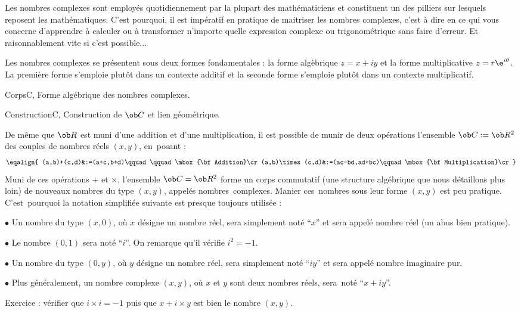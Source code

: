 Les nombres complexes sont employés quotidiennement par la plupart des ma\-thé\-ma\-ti\-ciens et constituent un des pilliers sur lesquels reposent les mathématiques. 
C'est pourquoi, il est impératif en pratique de maitriser les nombres complexes, c'est à dire en ce qui vous concerne d'apprendre à calculer ou à transformer n'importe quelle expression complexe ou trigonométrique sans faire d'erreur. Et raisonnablement vite si c'est possible...

Les nombres complexes se présentent sous deux formes fondamentales : la forme al\-gè\-bri\-que $z=x+iy$ 
et la forme multiplicative $z=r\e^{i\theta}$. La première forme s'emploie plutôt dans un contexte additif 
et la seconde forme s'emploie plutôt dans un contexte multiplicatif. 



\Section CorpsC, Forme algébrique des nombres complexes. 

\Subsection ConstructionC, Construction de $\ob C$ et lien géométrique. 

De même que $\ob R$ est muni d'une addition et d'une multiplication, 
il est possible de munir de deux opérations l'ensemble $\ob C:=\ob R^2$ des couples de nombres réels $(x,y)$, 
en~posant : 
$$
\eqalign{
(a,b)+(c,d)&:=(a+c,b+d)\qquad\qquad\mbox{\bf Addition}\cr
(a,b)\times(c,d)&:=(ac-bd,ad+bc)\qquad\mbox{\bf Multiplication}\cr
}%
$$
Muni de ces opérations $+$ et $\times$, l'ensemble $\ob C=\ob R^2$ forme un corps commutatif 
(une structure algébrique que nous détaillons plus loin) de nouveaux nombres du type $(x,y)$, appelés nombres~complexes. 
Manier ces~nombres sous leur forme $(x,y)$ est peu pratique. 
C'est~pourquoi la notation simplifiée suivante est presque toujours utilisée : 
\medskip
\item{$\bullet$}
Un nombre du type $(x,0)$, où $x$ désigne un nombre réel, sera simplement noté ``$x$'' et sera appelé nombre réel (un abus bien pratique).
\medskip
\item{$\bullet$} 
Le nombre $(0,1)$ sera noté ``$i$''. On remarque qu'il vérifie $i^2=-1$. 
\medskip
\item{$\bullet$} 
Un nombre du type $(0,y)$, où $y$ désigne un nombre réel, sera simplement noté ``$iy$'' et sera appelé nombre imaginaire pur. 
\medskip
\item{$\bullet$}
Plus généralement, un nombre complexe $(x,y)$, où $x$ et $y$ sont deux nombres réels, sera~noté ``$x+iy$''. 
\bigskip

\noindent
Exercice : vérifier que $i\times i=-1$ puis que $x+i\times y$ est bien le nombre $(x,y)$. 
\bigskip

